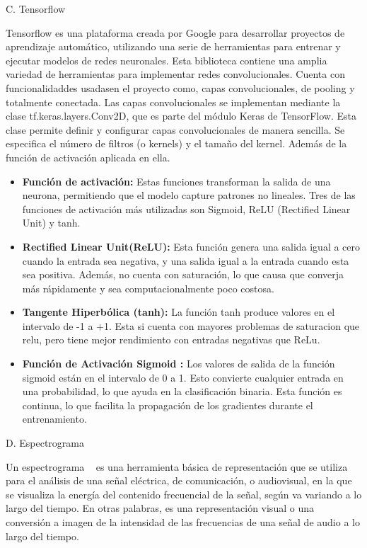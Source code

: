 \documentclass[conference, spanish, english]{IEEEtran}
\begin{document}
\begin{center}
    C. Tensorflow
\end{center}
\cite{pang2020} Tensorflow es una plataforma creada por Google para desarrollar proyectos de aprendizaje automático, utilizando una serie de herramientas para entrenar y ejecutar modelos de redes neuronales. Esta biblioteca contiene una amplia variedad de herramientas para implementar redes convolucionales. Cuenta con funcionalidaddes usadasen el proyecto como, capas convolucionales, de pooling y totalmente conectada. Las capas convolucionales se implementan mediante la clase tf.keras.layers.Conv2D, que es parte del módulo Keras de TensorFlow. Esta clase permite definir y configurar capas convolucionales de manera sencilla. Se especifica el número de filtros (o kernels) y el tamaño del kernel. Además de la función de activación aplicada en ella.

\begin{itemize}
 \item \textbf{Función de activación:} Estas funciones transforman la salida de una neurona, permitiendo que el modelo capture patrones no lineales. Tres de las funciones de activación más utilizadas son Sigmoid, ReLU (Rectified Linear Unit) y tanh.
 \item \textbf {Rectified Linear Unit(ReLU):} Esta función genera una salida igual a cero cuando la entrada sea negativa, y una salida igual a la entrada cuando esta sea positiva. Además, no cuenta con saturación, lo que causa que converja más rápidamente y sea computacionalmente poco costosa.
 \item \textbf {Tangente Hiperbólica (tanh):} La función tanh produce valores en el intervalo de -1 a +1. Esta si cuenta con mayores problemas de saturacion que relu, pero tiene mejor rendimiento con entradas negativas que ReLu. 
 \item \textbf {Función de Activación Sigmoid
:} Los valores de salida de la función sigmoid están en el intervalo de 0 a 1. Esto convierte cualquier entrada en una probabilidad, lo que ayuda en la clasificación binaria. Esta función es continua, lo que facilita la propagación de los gradientes durante el entrenamiento.

\end{itemize}

\begin{center}
    D. Espectrograma
\end{center}

Un espectrograma ~\cite{paz2020procesamiento} es una herramienta básica de representación que se utiliza para el análisis de una señal eléctrica, de comunicación, o audiovisual, en la que se visualiza la energía del contenido frecuencial de la señal, según va variando a lo largo del tiempo. En otras palabras, es una representación visual o una conversión a imagen de la intensidad de las frecuencias de una señal de audio a lo largo del tiempo. 
\end{document}

